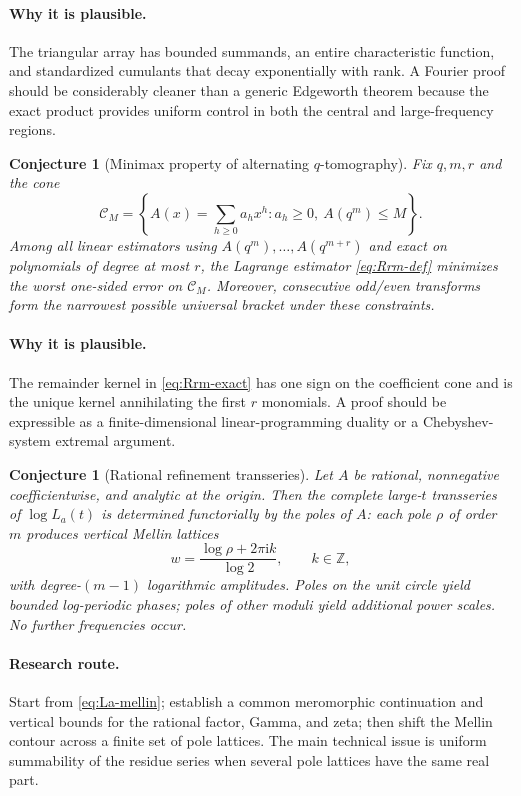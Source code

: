 \documentclass[11pt,oneside]{article}
\numberwithin{equation}{section}
\newtheorem{conjecture}[theorem]{Conjecture}
\theoremstyle{definition}
\theoremstyle{remark}
\newcommand{\Z}{\mathbb Z}
\newcommand{\ii}{\mathrm i}
\begin{document}
\paragraph{Why it is plausible.}
The triangular array has bounded summands, an entire characteristic function, and
standardized cumulants that decay exponentially with rank.  A Fourier proof should be
considerably cleaner than a generic Edgeworth theorem because the exact product provides
uniform control in both the central and large-frequency regions.

\begin{conjecture}[Minimax property of alternating $q$-tomography]
\label{conj:minimax}
Fix $q,m,r$ and the cone
\[
 \mathcal C_M=
 \left\{A(x)=\sum_{h\ge0}a_hx^h:a_h\ge0,
 \ A(q^m)\le M\right\}.
\]
Among all linear estimators using $A(q^m),\ldots,A(q^{m+r})$ and exact on polynomials of
degree at most $r$, the Lagrange estimator \eqref{eq:Rrm-def} minimizes the worst one-sided
error on $\mathcal C_M$.  Moreover, consecutive odd/even transforms form the narrowest
possible universal bracket under these constraints.
\end{conjecture}

\paragraph{Why it is plausible.}
The remainder kernel in \eqref{eq:Rrm-exact} has one sign on the coefficient cone and is the
unique kernel annihilating the first $r$ monomials.  A proof should be expressible as a
finite-dimensional linear-programming duality or a Chebyshev-system extremal argument.

\begin{conjecture}[Rational refinement transseries]
\label{conj:rational-transseries}
Let $A$ be rational, nonnegative coefficientwise, and analytic at the origin.  Then the
complete large-$t$ transseries of $\log L_a(t)$ is determined functorially by the poles of
$A$: each pole $\rho$ of order $m$ produces vertical Mellin lattices
\[
 w=\frac{\log\rho+2\pi\ii k}{\log2},
 \qquad k\in\Z,
\]
with degree-$(m-1)$ logarithmic amplitudes.  Poles on the unit circle yield bounded
log-periodic phases; poles of other moduli yield additional power scales.  No further
frequencies occur.
\end{conjecture}

\paragraph{Research route.}
Start from \eqref{eq:La-mellin}; establish a common meromorphic continuation and vertical
bounds for the rational factor, Gamma, and zeta; then shift the Mellin contour across a
finite set of pole lattices.  The main technical issue is uniform summability of the residue
series when several pole lattices have the same real part.
\end{document}
